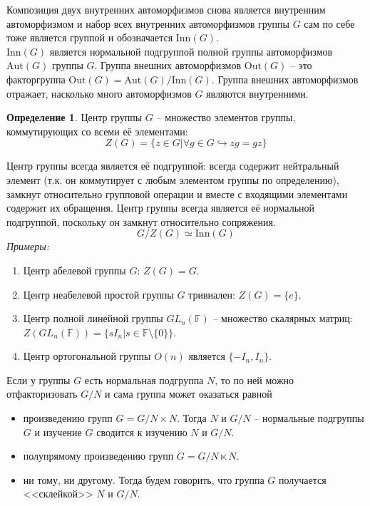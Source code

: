 \documentclass[12pt]{article}
\theoremstyle{definition}
\newtheorem{defin}[theorem]{Определение}
\begin{document}
Композиция двух внутренних автоморфизмов снова является внутренним автоморфизмом и набор всех внутренних автоморфизмов группы $G$ сам по себе тоже является группой и обозначается $\text{Inn}(G)$.\\
$\text{Inn}(G)$ является нормальной подгруппой полной группы автоморфизмов $\text{Aut}(G)$ группы $G$. Группа внешних автоморфизмов $\text{Out}(G)$ -- это факторгруппа $\text{Out}(G) = \text{Aut}(G)/\text{Inn}(G)$.
Группа внешних автоморфизмов отражает, насколько много автоморфизмов $G$ являются внутренними.
\begin{defin}
    Центр группы $G$ -- множество элементов группы, коммутирующих со всеми её элементами:
    \begin{equation}
        Z(G)=\{z\in G|\forall g\in G\hookrightarrow zg=gz\}
    \end{equation}
\end{defin}
Центр группы всегда является её подгруппой: всегда содержит нейтральный элемент (т.к. он коммутирует с любым элементом группы по определению), замкнут относительно групповой операции и вместе с входящими элементами содержит их обращения. Центр группы всегда является её нормальной подгруппой, поскольку он замкнут относительно сопряжения.\\
\begin{equation}
    G/Z(G)\simeq \text{Inn}(G)
\end{equation}
\textit{Примеры:}
\begin{enumerate}
    \item Центр абелевой группы $G$: $Z(G)=G$.
    \item Центр неабелевой простой группы $G$ тривиален: $Z(G)=\{e\}$.
    \item Центр полной линейной группы $GL_n(\mathbb{F})$ -- множество скалярных матриц: $Z(GL_n(\mathbb{F}))=\{sI_n|s\in\mathbb{F}\setminus\{0\}\}$.
    \item Центр ортогональной группы $O(n)$ является $\{-I_n,I_n\}$.
\end{enumerate}
Если у группы $G$ есть нормальная подгруппа $N$, то по ней можно отфакторизовать $G/N$ и сама группа может оказаться равной 
\begin{itemize}
    \item произведению групп $G=G/N\times N$. Тогда $N$ и $G/N$ -- нормальные подгруппы $G$ и изучение $G$ сводится к изучению $N$ и $G/N$.
    \item полупрямому произведению групп $G=G/N\ltimes N$.
    \item ни тому, ни другому. Тогда будем говорить, что группа $G$ получается <<склейкой>> $N$ и $G/N$.
\end{itemize}
\end{document}
